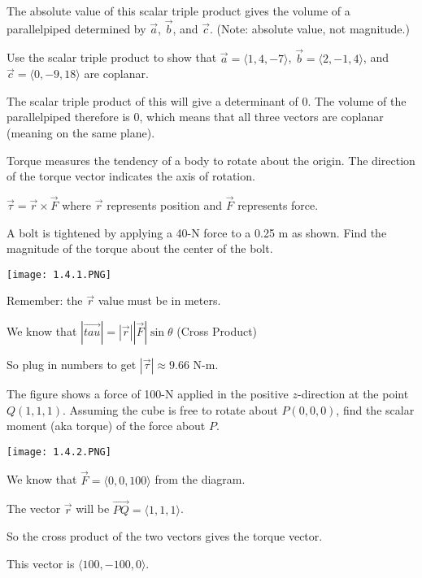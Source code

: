 \documentclass[../calc3.tex]{subfiles}
\begin{document}
The absolute value of this scalar triple product gives the volume of a parallelpiped determined by $\vec{a}$, $\vec{b}$, and $\vec{c}$. (Note: absolute value, not magnitude.)

\begin{example}
    Use the scalar triple product to show that $\vec{a}=\langle 1,4,-7\rangle$, $\vec{b}=\langle 2,-1,4\rangle$, and $\vec{c}=\langle 0,-9,18\rangle$ are coplanar.

    The scalar triple product of this will give a determinant of 0. The volume of the parallelpiped therefore is 0, which means that all three vectors are coplanar (meaning on the same plane).
\end{example}

Torque measures the tendency of a body to rotate about the origin. The direction of the torque vector indicates the axis of rotation.

$\vec{\tau}=\vec{r}\times \vec{F}$ where $\vec{r}$ represents position and $\vec{F}$ represents force.

\begin{example}
    A bolt is tightened by applying a 40-N force to a 0.25 m as shown. Find the magnitude of the torque about the center of the bolt.
    \begin{center}
        \texttt{[image: 1.4.1.PNG]}
    \end{center}

    Remember: the $\vec{r}$ value must be in meters.

    We know that $|\vec{tau}|=|\vec{r}||\vec{F}|\sin\theta$ (Cross Product)

    So plug in numbers to get $|\vec{\tau}| \approx 9.66$ N-m.
\end{example}

\begin{example}
    The figure shows a force of 100-N applied in the positive $z$-direction at the point $Q(1,1,1)$. Assuming the cube is free to rotate about $P(0,0,0)$, find the scalar moment (aka torque) of the force about $P$.
    \begin{center}
        \texttt{[image: 1.4.2.PNG]}
    \end{center}

    We know that $\vec{F}=\langle 0,0,100\rangle$ from the diagram.

    The vector $\vec{r}$ will be $\overrightarrow{PQ} = \langle 1,1,1\rangle$.

    So the cross product of the two vectors gives the torque vector.

    This vector is $\langle 100,-100,0\rangle$.
\end{example}
\end{document}
